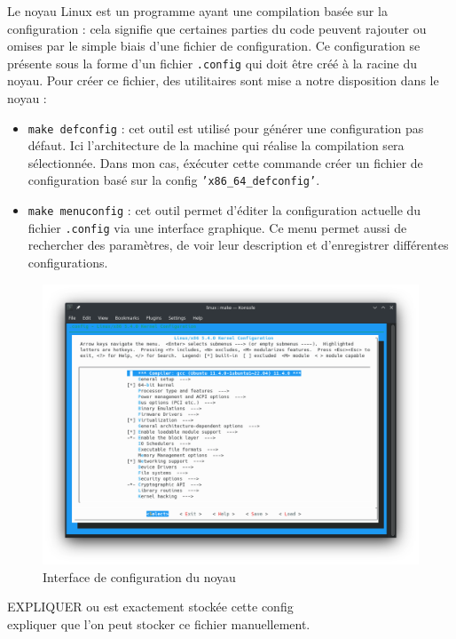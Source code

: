 Le noyau Linux est un programme ayant une compilation basée sur la configuration : cela signifie que certaines parties du code peuvent rajouter ou omises par le simple biais d'une fichier de configuration. Ce configuration se présente sous la forme d'un fichier \texttt{.config} qui doit être créé à la racine du noyau. Pour créer ce fichier, des utilitaires sont mise a notre disposition dans le noyau :
\begin{itemize}
    \item \texttt{make defconfig} : cet outil est utilisé pour générer une configuration pas défaut. Ici l'architecture de la machine qui réalise la compilation sera sélectionnée. Dans mon cas, éxécuter cette commande créer un fichier de configuration basé sur la config \texttt{'x86\_64\_defconfig'}.
    \item \texttt{make menuconfig} : cet outil permet d'éditer la configuration actuelle du fichier \texttt{.config} via une interface graphique. Ce menu permet aussi de rechercher des paramètres, de voir leur description et d'enregistrer différentes configurations.
\end{itemize}

\begin{figure}[H]
    \centering
    \includegraphics[width=0.65\paperwidth]{Images/make menuconfig.png}
    \caption{Interface de configuration du noyau}
\end{figure}

\begin{center}
    \color{red}
    EXPLIQUER ou est exactement stockée cette config \\
expliquer que l'on peut stocker ce fichier manuellement.
\end{center}


